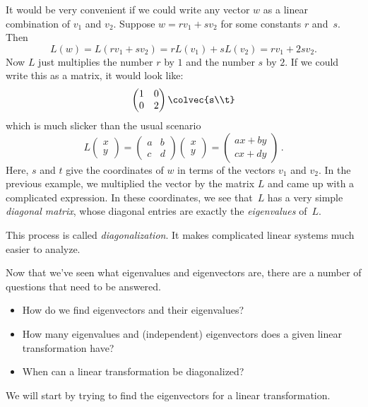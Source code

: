 It would be very convenient if we could write any vector $w$ as a linear combination of $v_1$ and $v_2$.  Suppose $w=rv_1+sv_2$ for some constants $r$ and~$s$.  Then
\[
L(w)=L(rv_1+sv_2)=rL(v_1)+sL(v_2)=rv_1+2sv_2.
\]
Now $L$ just multiplies the number $r$ by $1$ and the number $s$ by $2$.  If we could write this as a matrix, it would look like:
\[
\begin{pmatrix}
1 & 0 \\
0 & 2
\end{pmatrix}\colvec{s\\t}
\]
which is much slicker than the usual scenario  \[L\!\begin{pmatrix}
x\\
y
\end{pmatrix}\!=\!\begin{pmatrix}
\!a&b\! \\
\!c&d\!
\end{pmatrix} \! \!\begin{pmatrix}
x \\
y
\end{pmatrix}\!=\!
\begin{pmatrix}
\!ax+by\! \\
\!cx+dy\!
\end{pmatrix}\, .\]
Here, $s$ and $t$ give the coordinates of $w$ in terms of the vectors $v_1$ and $v_2$.  In the previous example, we multiplied the vector by the matrix $L$ and came up with a complicated expression.  In these coordinates, we see that~$L$ has a very simple \emph{diagonal matrix}, whose diagonal entries are exactly the \emph{eigenvalues} of~$L$.

This process is called \emph{diagonalization}. It makes complicated linear systems much easier to analyze.


Now that we've seen what eigenvalues and eigenvectors are, there are a number of questions that need to be answered.

\begin{itemize}
\item How do we find eigenvectors and their eigenvalues?
\item How many eigenvalues and (independent) eigenvectors does a given linear transformation have?
\item When can a linear transformation be diagonalized?
\end{itemize}
We will start by trying to find the eigenvectors for a linear transformation.

